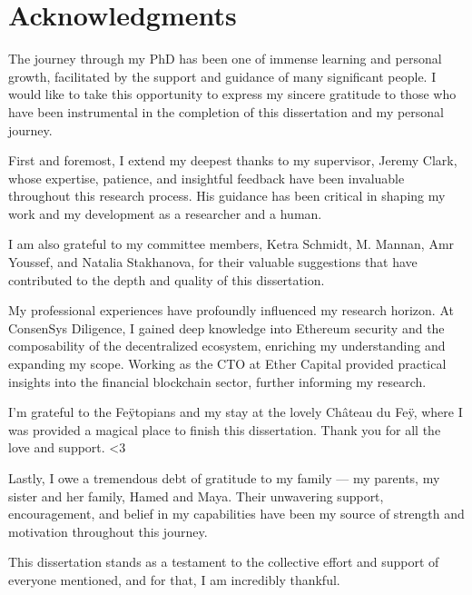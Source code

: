 
\chapter*{Acknowledgments}

The journey through my PhD has been one of immense learning and personal growth, facilitated by the support and guidance of many significant people. I would like to take this opportunity to express my sincere gratitude to those who have been instrumental in the completion of this dissertation and my personal journey.
 \vspace{0.5cm} 

First and foremost, I extend my deepest thanks to my supervisor, Jeremy Clark, whose expertise, patience, and insightful feedback have been invaluable throughout this research process. His guidance has been critical in shaping my work and my development as a researcher and a human. 
 \vspace{0.5cm} 

I am also grateful to my committee members, Ketra Schmidt, M. Mannan, Amr Youssef, and Natalia Stakhanova, for their valuable suggestions that have contributed to the depth and quality of this dissertation. %
 \vspace{0.5cm} 

My professional experiences have profoundly influenced my research horizon. At ConsenSys Diligence, I gained deep knowledge into Ethereum security and the composability of the decentralized ecosystem, enriching my understanding and expanding my scope. Working as the CTO at Ether Capital provided practical insights into the financial blockchain sector, further informing my research. 
 \vspace{0.5cm} 

I'm grateful to the Fe\"ytopians and my stay at the lovely Ch\^ateau du Fe\"y, where I was provided a magical place to finish this dissertation. Thank you for all the love and support. \textless3 
 \vspace{0.5cm} 

Lastly, I owe a tremendous debt of gratitude to my family — my parents, my sister and her family, Hamed and Maya. Their unwavering support, encouragement, and belief in my capabilities have been my source of strength and motivation throughout this journey.
 \vspace{0.5cm} 

This dissertation stands as a testament to the collective effort and support of everyone mentioned, and for that, I am incredibly thankful.



